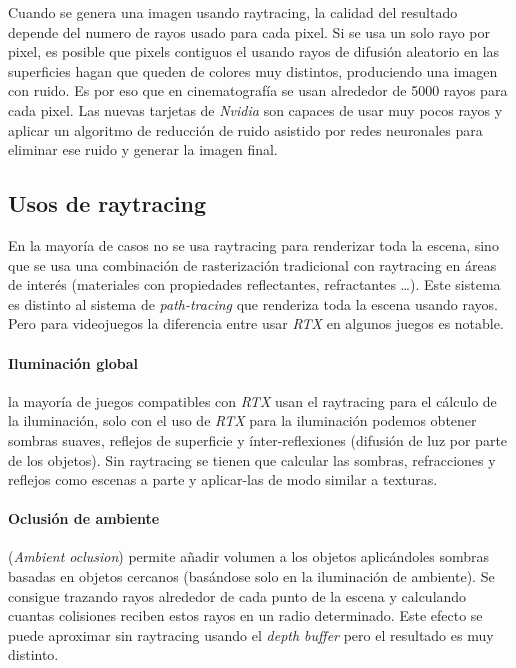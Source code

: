 \begin{pregunta}
Cuando se genera una imagen usando raytracing, la calidad del resultado depende
del numero de rayos usado para cada pixel. Si se usa un solo rayo por pixel, es
posible que pixels contiguos el usando rayos de difusión aleatorio en las
superficies hagan que queden de colores muy distintos, produciendo una imagen
con ruido. Es por eso que en cinematografía se usan alrededor de 5000 rayos para
cada pixel. Las nuevas tarjetas de \emph{Nvidia} son capaces de usar muy pocos
rayos y aplicar un algoritmo de reducción de ruido asistido por redes neuronales
para eliminar ese ruido y generar la imagen final.

\subsection*{Usos de raytracing}

En la mayoría de casos no se usa raytracing para renderizar toda la escena, sino
que se usa una combinación de rasterización tradicional con raytracing en áreas
de interés (materiales con propiedades reflectantes, refractantes \dots). Este
sistema es distinto al sistema de \emph{path-tracing} que renderiza toda la
escena usando rayos. Pero para videojuegos la diferencia entre usar \emph{RTX}
en algunos juegos es notable.

\paragraph{Iluminación global} la mayoría de juegos compatibles con \emph{RTX}
usan el raytracing para el cálculo de la iluminación, solo con el uso de
\emph{RTX} para la iluminación podemos obtener sombras suaves, reflejos de
superficie y ínter-reflexiones (difusión de luz por parte de los objetos).
Sin raytracing se tienen que calcular las sombras, refracciones y reflejos como
escenas a parte y aplicar-las de modo similar a texturas.

\paragraph{Oclusión de ambiente} (\emph{Ambient oclusion}) permite añadir
volumen a los objetos aplicándoles sombras basadas en objetos cercanos
(basándose solo en la iluminación de ambiente). Se consigue trazando rayos
alrededor de cada punto de la escena y calculando cuantas colisiones reciben
estos rayos en un radio determinado. Este efecto se puede aproximar
sin raytracing usando el \emph{depth buffer} pero el resultado es muy distinto.


\end{pregunta}

